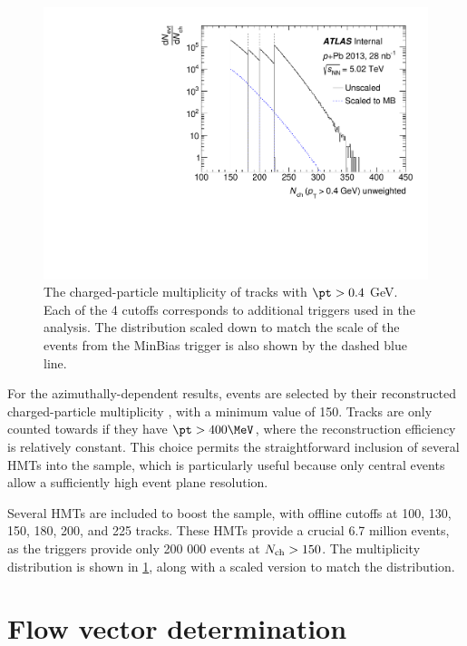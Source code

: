 \begin{figure}[t]
\centering
\includegraphics{can_nch.pdf}
\caption{The charged-particle multiplicity \Nch of tracks with $\pt > 0.4$ GeV. Each of the 4 cutoffs corresponds to additional triggers used in the analysis. The distribution scaled down to match the scale of the events from the MinBias trigger is also shown by the dashed blue line.}
\label{fig:nch}
\end{figure}

For the azimuthally-dependent results, events are selected by their reconstructed charged-particle multiplicity \Nch, with a minimum value of 150.
Tracks are only counted towards \Nch if they have $\pt > 400 \MeV$, where the reconstruction efficiency is relatively constant.
This choice permits the straightforward inclusion of several \acp{HMT} into the sample, which is particularly useful because only central events allow a sufficiently high event plane resolution.

Several \acp{HMT} are included to boost the sample, with offline \Nch cutoffs at 100, 130, 150, 180, 200, and 225 tracks.
These \acp{HMT} provide a crucial 6.7 million events, as the \minbias triggers provide only 200 000 events at $\mbox{$N_{\mathrm{ch}}$} > 150$.
The multiplicity distribution is shown in \cref{fig:nch}, along with a scaled version to match the \minbias distribution.

\section{Flow vector determination}

